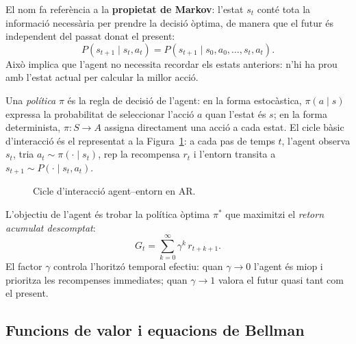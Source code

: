 El nom fa referència a la \textbf{propietat de Markov}: l'estat
$s_t$ conté tota la informació necessària per prendre la decisió òptima, de
manera que el futur és independent del passat donat el present:
\[
  P(s_{t+1} \mid s_t, a_t) = P(s_{t+1} \mid s_0, a_0, \ldots, s_t, a_t).
\]
Això implica que l'agent no necessita recordar els estats anteriors: n'hi ha
prou amb l'estat actual per calcular la millor acció.

Una \emph{política} $\pi$ és la regla de decisió de l'agent: en la forma
estocàstica, $\pi(a \mid s)$ expressa la probabilitat de seleccionar l'acció
$a$ quan l'estat és $s$; en la forma determinista, $\pi : S \to A$ assigna
directament una acció a cada estat. El cicle bàsic d'interacció és el
representat a la Figura~\ref{fig:cicle-ar}: a cada pas de temps $t$, l'agent
observa $s_t$, tria $a_t \sim \pi(\cdot \mid s_t)$, rep la recompensa $r_t$ i
l'entorn transita a $s_{t+1} \sim P(\cdot \mid s_t, a_t)$.

\begin{figure}[H]
  \centering
  \caption{Cicle d'interacció agent–entorn en \acs{AR}.}
  \label{fig:cicle-ar}
\end{figure}

L'objectiu de l'agent és trobar la política òptima $\pi^*$ que maximitzi el
\emph{retorn acumulat descomptat}:
\[
  G_t = \sum_{k=0}^{\infty} \gamma^k\, r_{t+k+1}.
\]
El factor $\gamma$ controla l'horitzó temporal efectiu: quan $\gamma \to 0$
l'agent és miop i prioritza les recompenses immediates; quan $\gamma \to 1$
valora el futur quasi tant com el present.

\FloatBarrier
\subsection*{Funcions de valor i equacions de Bellman}

